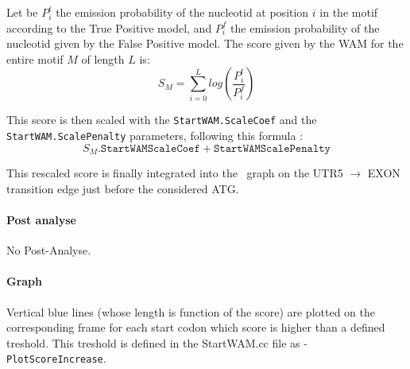 Let be $P^t_i$ the emission probability of the nucleotid at position
$i$ in the motif according to the True Positive model, and $P^f_i$ the
emission probability of the nucleotid given by the False Positive
model. The score given by the WAM for the entire motif $M$ of length
$L$ is:
\[ S_M = \sum_{i=0}^{L} log\left(\frac{P^t_i}{P^f_i}\right) \]

This score is then scaled with the \texttt{StartWAM.ScaleCoef} and the
\texttt{StartWAM.ScalePenalty} parameters, following this formula :
$$S_M . \texttt{StartWAMScaleCoef} + \texttt{StartWAMScalePenalty}$$

This rescaled score is finally integrated into the \EuGenie\ graph on
the UTR5 $\to$ EXON transition edge just before the considered
ATG.

\paragraph{Post analyse}

No Post-Analyse.

\paragraph{Graph}

Vertical blue lines (whose length is function of the score) are
plotted on the corresponding frame for each start codon which score is
higher than a defined treshold. This treshold is defined in the
StartWAM.cc file as -\texttt{PlotScoreIncrease}.
